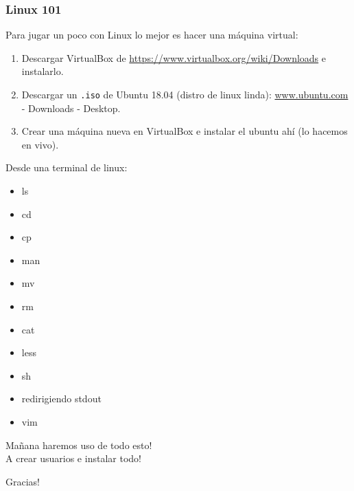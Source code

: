 \documentclass[handout]{beamer}
\begin{document}
\begin{frame}
\frametitle{Linux 101}
Para jugar un poco con Linux lo mejor es hacer una máquina virtual:

\begin{enumerate}
  \item Descargar VirtualBox de \url{https://www.virtualbox.org/wiki/Downloads} e instalarlo.
  \item Descargar un \Verb=.iso= de Ubuntu 18.04 (distro de linux linda): \url{www.ubuntu.com} - Downloads - Desktop.
  \item Crear una máquina nueva en VirtualBox e instalar el ubuntu ahí (lo hacemos en vivo).
  \end{enumerate}

\end{frame}

\begin{frame}
Desde una terminal de linux:
 \begin{itemize}
  \item ls
  \item cd
  \item cp
  \item man
  \item mv
  \item rm
  \item cat
  \item less
  \item sh
  \item redirigiendo stdout
  \item vim
 \end{itemize}
\end{frame}

\begin{frame}
\huge{Mañana haremos uso de todo esto!\\A crear usuarios e instalar todo!}

\huge{Gracias!}
\end{frame}
\end{document}
